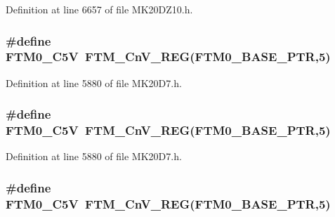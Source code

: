 Definition at line 6657 of file M\+K20\+D\+Z10.\+h.

\subsubsection[{\texorpdfstring{F\+T\+M0\+\_\+\+C5V}{FTM0_C5V}}]{\setlength{\rightskip}{0pt plus 5cm}\#define F\+T\+M0\+\_\+\+C5V~{\bf F\+T\+M\+\_\+\+Cn\+V\+\_\+\+R\+EG}({\bf F\+T\+M0\+\_\+\+B\+A\+S\+E\+\_\+\+P\+TR},5)}\hypertarget{group___f_t_m___register___accessor___macros_gaf340f7fe7e08b436b55e66cfa88e8683}{}\label{group___f_t_m___register___accessor___macros_gaf340f7fe7e08b436b55e66cfa88e8683}


Definition at line 5880 of file M\+K20\+D7.\+h.

\subsubsection[{\texorpdfstring{F\+T\+M0\+\_\+\+C5V}{FTM0_C5V}}]{\setlength{\rightskip}{0pt plus 5cm}\#define F\+T\+M0\+\_\+\+C5V~{\bf F\+T\+M\+\_\+\+Cn\+V\+\_\+\+R\+EG}({\bf F\+T\+M0\+\_\+\+B\+A\+S\+E\+\_\+\+P\+TR},5)}\hypertarget{group___f_t_m___register___accessor___macros_gaf340f7fe7e08b436b55e66cfa88e8683}{}\label{group___f_t_m___register___accessor___macros_gaf340f7fe7e08b436b55e66cfa88e8683}


Definition at line 5880 of file M\+K20\+D7.\+h.

\subsubsection[{\texorpdfstring{F\+T\+M0\+\_\+\+C5V}{FTM0_C5V}}]{\setlength{\rightskip}{0pt plus 5cm}\#define F\+T\+M0\+\_\+\+C5V~{\bf F\+T\+M\+\_\+\+Cn\+V\+\_\+\+R\+EG}({\bf F\+T\+M0\+\_\+\+B\+A\+S\+E\+\_\+\+P\+TR},5)}\hypertarget{group___f_t_m___register___accessor___macros_gaf340f7fe7e08b436b55e66cfa88e8683}{}\label{group___f_t_m___register___accessor___macros_gaf340f7fe7e08b436b55e66cfa88e8683}


